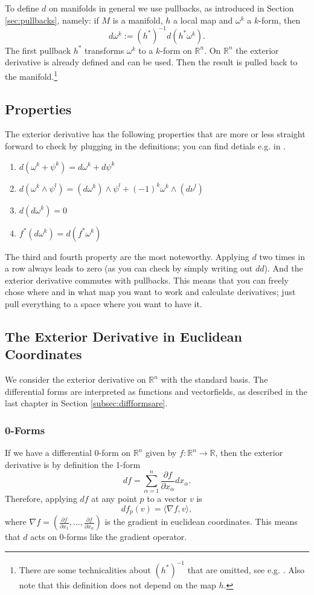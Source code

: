 To define $d$ on manifolds in general we use pullbacks, as introduced in Section \ref{sec:pullbacks}, namely: if $M$ is a manifold, $h$ a local map and $\omega^k$ a $k$-form, then
\[d\omega^k := (h^*)^{-1}d(h^*\omega^k).\]
The first pullback $h^*$ transforms $\omega^k$ to a $k$-form on $\mathbb R^n$. On $\mathbb R^n$ the exterior derivative is already defined and can be used. Then the result is pulled back to the manifold.\footnote{There are some technicalities about $(h^*)^{-1}$ that are omitted, see e.g. \cite{globalAnalysis}. Also note that this definition does not depend on the map $h$.}

\subsection{Properties}
The exterior derivative has the following properties that are more or less straight forward to check by plugging in the definitions; you can find detials e.g. in \cite{globalAnalysis}.

\begin{enumerate}
\item $d(\omega^k + \psi^k) = d\omega^k + d\psi^k$
\item $d(\omega^k \wedge \psi^l) =( d\omega^k) \wedge \psi^l + (-1)^k \omega^k \wedge(d \nu^l)$
\item $d(d\omega^k) = 0$
\item $f^*(d\omega^k) = d(f^* \omega^k)$
\end{enumerate}
 The third and fourth property are the most noteworthy.  Applying $d$ two times in a row always leads to zero (as you can check by simply writing out $dd$). And the exterior derivative commutes with pullbacks. This means that you can freely chose where and in what map you want to work and calculate derivatives; just pull everything to a space where you want to have it.


\subsection{The Exterior Derivative in Euclidean Coordinates}
\label{subsec:EDeuclidean}
We consider the exterior derivative on $\mathbb R^n$ with the standard basis. The differential forms are interpreted as functions and vectorfields, as described in the last chapter in Section \ref{subsec:diffformsare}.

\subsubsection{0-Forms}
If we have a differential $0$-form on $\mathbb R^n$  given by $f:\mathbb R^n \to \mathbb R$, then the exterior derivative is by definition the 1-form
\[df = \sum_{\alpha = 1}^n \frac{\partial f}{\partial x_\alpha} dx_\alpha .\]
Therefore, applying $df$ at any point $p$ to a vector $v$ is
\[df_p(v) = \langle \nabla f, v \rangle,\]
where $\nabla f = (\frac{\partial f}{\partial x_1},...,\frac{\partial f}{\partial x_n})$ is the gradient in euclidean coordinates. This means that $d$ acts on $0$-forms like the gradient operator.


